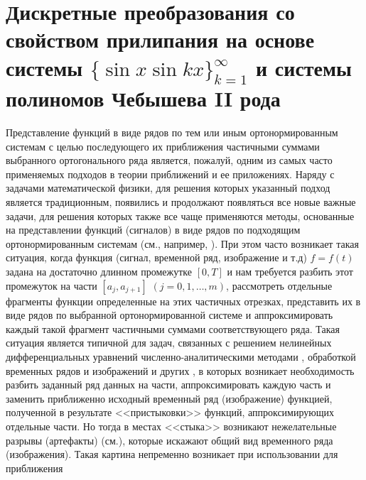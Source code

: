 \section{Дискретные преобразования со свойством прилипания на основе системы $\{\sin x\sin kx\}_{k=1}^{\infty}$ и системы полиномов Чебышева II рода} \label{sect-6.2}


Представление функций в виде рядов по тем или иным ортонормированным системам с целью последующего их приближения
частичными суммами выбранного ортогонального ряда является, пожалуй, одним из самых часто применяемых подходов в теории приближений и ее приложениях. Наряду с задачами математической физики, для решения которых указанный подход является традиционным, появились и продолжают появляться все новые важные задачи, для решения которых также все чаще применяются методы, основанные на представлении функций (сигналов) в виде рядов по подходящим ортонормированным системам (см., например, \cite{shii1, shii2, dedus3, pash4, arush5, tref6, tref7, muku8}). При этом часто возникает такая ситуация, когда функция (сигнал, временной ряд, изображение и т.д) $f=f(t)$ задана на достаточно длинном промежутке $[0,T]$ и нам требуется разбить этот промежуток на части $[a_j,a_{j+1}]$ $(j=0,1,\ldots,m)$, рассмотреть отдельные фрагменты функции определенные на этих частичных отрезках, представить их в виде рядов по выбранной ортонормированной системе и аппроксимировать каждый такой фрагмент частичными суммами соответствующего ряда. Такая ситуация является типичной для задач, связанных с решением нелинейных дифференциальных уравнений численно-аналитическими методами \cite{pash4, tref6}, обработкой временных рядов и изображений и других \cite{arush5, tref6, tref7}, в которых
возникает необходимость разбить заданный ряд данных на части,
аппроксимировать каждую часть и заменить приближенно исходный
временный ряд (изображение) функцией, полученной в результате
<<пристыковки>> функций, аппроксимирующих отдельные части. Но тогда в
местах <<стыка>> возникают нежелательные разрывы (артефакты) (см.\cite{muku8}), которые искажают общий вид временного ряда (изображения). Такая
картина непременно возникает при использовании для приближения
